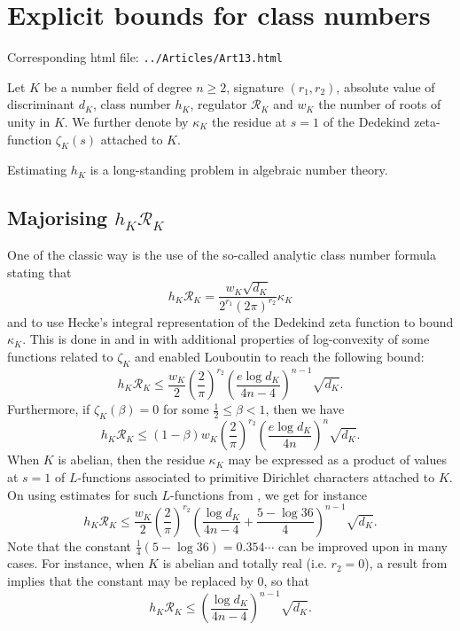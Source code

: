 \chapter{  Explicit bounds for class numbers}

Corresponding html file: \texttt{../Articles/Art13.html}









Let $K$ be a number field of degree $n\ge2$, signature $(r_1,r_2)$, absolute
value of discriminant $d_K$, class number $h_K$, regulator $\mathcal{R}_K$ and
$w_K$ the number of roots of unity in $K$. We further denote by $\kappa_K$ the
residue at $s=1$ of the Dedekind zeta-function $\zeta_K(s)$ attached to $K$.
\par \par 
Estimating $h_K$ is a long-standing problem in algebraic number theory.


\section{Majorising $h_K\mathcal{R}_K$}




One of
the classic way is the use of the so-called analytic class number
formula stating that
$$
h_K\mathcal{R}_K=\frac{w_K \sqrt{d_K}}{2^{r_1}(2\pi)^{r_2}}\kappa_K
$$
and to use Hecke's integral representation of the Dedekind zeta function to
bound $\kappa_K$. This is done in
\cite{Louboutin*00} and in
\cite{Louboutin*01} with additional
properties of log-convexity of some functions related to $\zeta_K$ and enabled
Louboutin to reach the following bound:
$$
h_K\mathcal{R}_K
\le\frac{w_K}{2}\left(\frac{2}{\pi}\right)^{r_2}
\left(\frac{e\log d_K}{4n-4}\right)^{n-1}\sqrt{d_K}.
$$
Furthermore, if $\zeta_K(\beta)=0$ for some $\tfrac12\le \beta< 1$, then we have 
$$
h_K\mathcal{R}_K
\le(1-\beta)w_K\left(\frac{2}{\pi}\right)^{r_2}
\left(\frac{e\log d_K}{4n}\right)^{n}\sqrt{d_K}.
$$
When $K$ is abelian, then the residue $\kappa_K$ may be expressed as a
product of values at $s=1$ of $L$-functions associated to primitive Dirichlet
characters attached to $K$. On using estimates for such $L$-functions from
\cite{Ramare*01}, we get for instance
$$
h_K\mathcal{R}_K
\le
\frac{w_K}{2}\left(\frac{2}{\pi}\right)^{r_2}
\left(\frac{\log d_K}{4n-4}+\frac{5-\log 36}{4}\right)^{n-1}\sqrt{d_K}.
$$
Note that the constant $\frac14(5-\log 36)=0.354\cdots$ can be improved upon
in many cases. For instance, when $K$ is abelian and totally real (i.e. $r_2=0$), a result
from
\cite{Ramare*01} implies that the
constant may be replaced by 0, so that
$$
h_K\mathcal{R}_K
\le
\left(\frac{\log d_K}{4n-4}\right)^{n-1}\sqrt{d_K}.
$$



